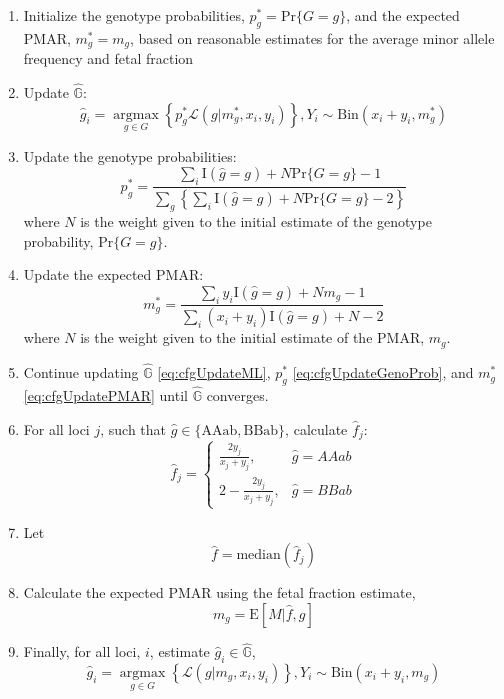 \documentclass[11pt,letterpaper]{book}
\begin{document}
\begin{enumerate}
\def\labelenumi{\arabic{enumi}.}
\item
  Initialize the genotype probabilities, \(p_g^* = \text{Pr}\{G = g\}\), and the expected PMAR, \(m_g^* = m_g\), based on reasonable estimates for the average minor allele frequency and fetal fraction
\item
  Update \(\hat{\mathbb{G}}\):
  \[
   \hat{g}_i = \mathop{\text{argmax}}\limits_{g \in G}\left\{p_g^*\mathcal{L}(g \rvert m_g^*,x_i,y_i)\right\}, Y_{i} \sim \text{Bin}(x_i + y_i, m_g^*) \label{eq:cfgUpdateML}
    \]
\item
  Update the genotype probabilities:
  \[
   p_g^* = \frac{\sum_i \text{I}(\hat{g} = g) + N\text{Pr}\{G = g\} - 1}{\sum_g\left\{\sum_i \text{I}(\hat{g} = g) + N\text{Pr}\{G = g\} - 2\right\}} \label{eq:cfgUpdateGenoProb}
    \]
  where \(N\) is the weight given to the initial estimate of the genotype probability, \(\text{Pr}\{G = g\}\).
\item
  Update the expected PMAR:
  \[
   m_g^* = \frac{\sum_i y_i\text{I}(\hat{g} = g) + Nm_g - 1}{\sum_i(x_i + y_i)\text{I}(\hat{g} = g) + N - 2} \label{eq:cfgUpdatePMAR}
    \]
  where \(N\) is the weight given to the initial estimate of the PMAR, \(m_g\).
\item
  Continue updating \(\hat{\mathbb{G}}\) \eqref{eq:cfgUpdateML}, \(p_g^*\) \eqref{eq:cfgUpdateGenoProb}, and \(m_g^*\) \eqref{eq:cfgUpdatePMAR} until \(\hat{\mathbb{G}}\) converges.
\item
  For all loci \(j\), such that \(\hat{g} \in \{\text{AAab}, \text{BBab}\}\), calculate \(\hat{f}_j\):
  \[
  \hat{f}_j =
    \begin{cases}
      \displaystyle\frac{2y_j}{x_j + y_j}, & \hat{g} = AAab \\[15pt]
      2 - \displaystyle\frac{2y_j}{x_j + y_j}, & \hat{g} = BBab
    \end{cases} \label{eq:cfgEstFF}
    \]
\item
  Let
  \[
  \hat{f} = \text{median}\left(\hat{f}_j\right) \label{eq:cfgFFMed}
    \]
\item
  Calculate the expected PMAR using the fetal fraction estimate,
  \[
   m_g = \text{E}[M|\hat{f},g] \label{eq:cfgExpPMAR}
    \]
\item
  Finally, for all loci, \(i\), estimate \(\hat{g}_i \in \hat{\mathbb{G}}\),
  \[
    \hat{g}_i = \mathop{\text{argmax}}\limits_{g \in G}\left\{\mathcal{L}(g \rvert m_g,x_i,y_i)\right\}, Y_{i} \sim \text{Bin}(x_i + y_i, m_g) \label{eq:cfgML}
    \]
\end{enumerate}
\end{document}
